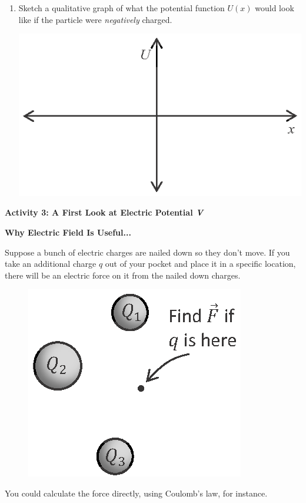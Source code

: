 \begin{enumerate}[wide, label=(\emph{\alph*})]
\item Sketch a qualitative graph of what the potential function $U(x)$ would look like if the particle were \textit{negatively} charged.

\begin{center}
\vspace{-0.1in}
\includegraphics{potential_intro/activity_2_figs/U_axes_2.eps}
\vspace{-0.1in}
\end{center}

\end{enumerate}

\pagebreak[3]
\textbf{Activity 3: A First Look at Electric Potential \textit{V}}

\textbf{Why Electric Field Is Useful...}


Suppose a bunch of electric charges are nailed down so they don't move.  If you take an additional charge $q$ out of your pocket and place it in a specific location, there will be an electric force on it from the nailed down charges.  
\begin{figure}
\begin{center}
\vspace{-0.3 in}
\includegraphics[scale=0.8]{potential_intro/activity_3_figs/charge_from_pocket.eps}
\end{center}
\end{figure}
You could calculate the force directly, using Coulomb's law, for instance.  

